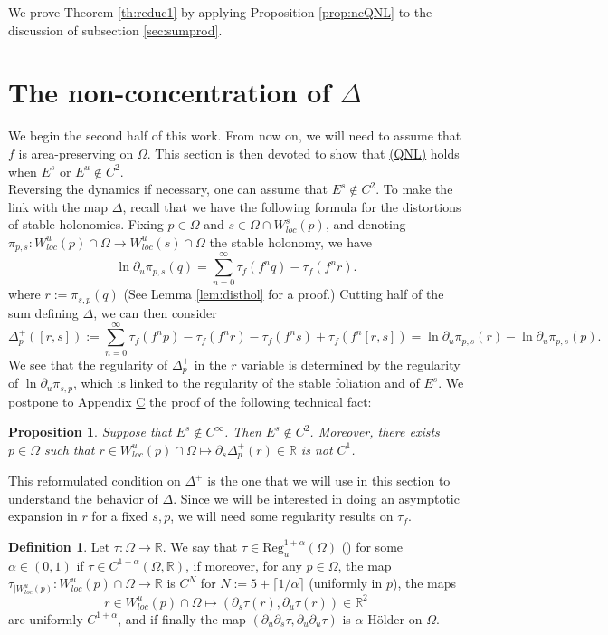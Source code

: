 \documentclass[a4paper]{article}
\newtheorem{proposition}[theorem]{Proposition}
\theoremstyle{definition}
\newtheorem{definition}{Definition}[section]
\begin{document}
We prove Theorem \ref{th:reduc1} by applying Proposition \ref{prop:ncQNL} to the discussion of subsection \ref{sec:sumprod}. 




\section{The non-concentration of $\Delta$}\label{sec:4}

We begin the second half of this work. From now on, we will need to assume that $f$ is area-preserving on $\Omega$. This section is then devoted to show that \hyperref[QNL]{(QNL)} holds when $E^s  \text{ or } E^u \notin C^2$. \\

Reversing the dynamics if necessary, one can assume that $E^s \notin C^2$. To make the link with the map $\Delta$, recall that we have the following formula for the distortions of stable holonomies. Fixing $p \in \Omega$ and $s \in \Omega \cap W^s_{loc}(p)$, and denoting $\pi_{p,s}:W_{loc}^u(p) \cap \Omega \rightarrow W_{loc}^u(s) \cap \Omega$ the stable holonomy, we have
$$ \ln \partial_u \pi_{p,s}(q) = \sum_{n=0}^\infty \tau_f(f^n q) - \tau_f(f^n r).$$
where $r := \pi_{s,p}(q)$ (See Lemma \ref{lem:disthol} for a proof.) Cutting half of the sum defining $\Delta$, we can then consider  $$\Delta^+_p([r,s]) := \sum_{n=0}^\infty \tau_f(f^{n} p) - \tau_f(f^{n}r) - \tau_f(f^{n}s) + \tau_f(f^{n}[r,s]) = \ln \partial_u \pi_{p,s}(r) - \ln \partial_u \pi_{p,s}(p).$$
We see that the regularity of $\Delta^+_p$ in the $r$ variable is determined by the regularity of $\ln \partial_u \pi_{s,p}$, which is linked to the regularity of the stable foliation and of $E^s$. We postpone to Appendix \hyperref[ap:C]{C} the proof of the following technical fact:

\begin{proposition}\label{prop:apC}
Suppose that $E^s \notin C^\infty$. Then $E^s \notin C^2$. Moreover, there exists $p \in \Omega$ such that $r \in W^u_{loc}(p) \cap \Omega \mapsto \partial_s \Delta^+_p(r) \in \mathbb{R}$ is not $C^1$. 
\end{proposition}

This reformulated condition on $\Delta^+$ is the one that we will use in this section to understand the behavior of $\Delta$. Since we will be interested in doing an asymptotic expansion in $r$ for a fixed $s,p$, we will need some regularity results on $\tau_f$. 


\begin{definition}
Let $\tau : \Omega \rightarrow \mathbb{R}$. We say that $\tau \in \text{Reg}_u^{1+\alpha}(\Omega)$ () for some $\alpha \in (0,1)$ if $\tau \in C^{1+\alpha}(\Omega,\mathbb{R})$,  if moreover, for any $p \in \Omega$, the map $\tau_{|W^u_{loc}(p)} : W^u_{loc}(p) \cap \Omega \rightarrow \mathbb{R}$ is $C^{N}$ for $N := 5 + \lceil 1/\alpha \rceil$ (uniformly in $p$), the maps
$$ r \in W^u_{loc}(p) \cap \Omega \longmapsto (\partial_s \tau(r),\partial_u \tau(r)) \in \mathbb{R}^2  $$
are uniformly $C^{1+\alpha}$, and if finally the map $(\partial_u \partial_s \tau, \partial_u \partial_u \tau)$ is $\alpha$-Hölder on $\Omega$.
\end{definition}
\end{document}
